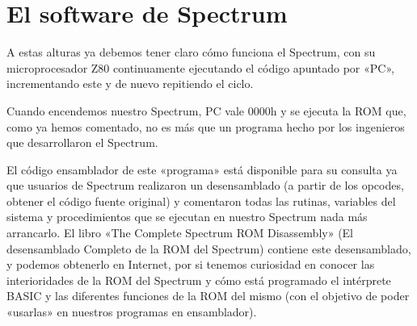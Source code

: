 \documentclass[letterpaper,10pt,spanish]{sphinxmanual}
\begin{document}
\section{El software de Spectrum}
\label{\detokenize{03_arquitectura/arquitectura:el-software-de-spectrum}}
A estas alturas ya debemos tener claro cómo funciona el Spectrum, con su microprocesador Z80 continuamente ejecutando el código apuntado por «PC», incrementando este y de nuevo repitiendo el ciclo.

Cuando encendemos nuestro Spectrum, PC vale 0000h y se ejecuta la ROM que, como ya hemos comentado, no es más que un programa hecho por los ingenieros que desarrollaron el Spectrum.

El código ensamblador de este «programa» está disponible para su consulta ya que usuarios de Spectrum realizaron un desensamblado (a partir de los opcodes, obtener el código fuente original) y comentaron todas las rutinas, variables del sistema y procedimientos que se ejecutan en nuestro Spectrum nada más arrancarlo. El libro «The Complete Spectrum ROM Disassembly» (El desensamblado Completo de la ROM del Spectrum) contiene este desensamblado, y podemos obtenerlo en Internet, por si tenemos curiosidad en conocer las interioridades de la ROM del Spectrum y cómo está programado el intérprete BASIC y las diferentes funciones de la ROM del mismo (con el objetivo de poder «usarlas» en nuestros programas en ensamblador).
\end{document}
